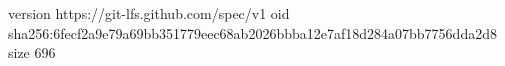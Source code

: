 version https://git-lfs.github.com/spec/v1
oid sha256:6fecf2a9e79a69bb351779eec68ab2026bbba12e7af18d284a07bb7756dda2d8
size 696
